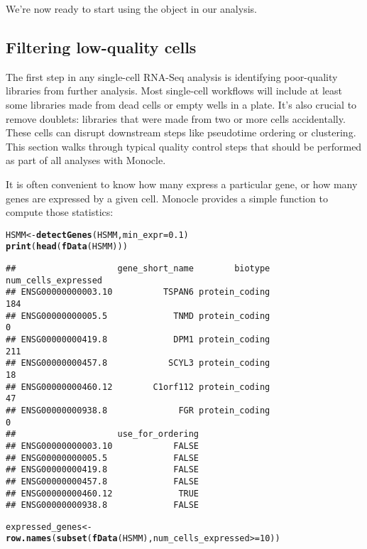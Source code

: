 \documentclass[10pt,oneside]{article}\usepackage[]{graphicx}\usepackage[]{color}
\makeatletter
\newcommand{\hlnum}[1]{\textcolor[rgb]{0.686,0.059,0.569}{#1}}%
\newcommand{\hlopt}[1]{\textcolor[rgb]{0,0,0}{#1}}%
\newcommand{\hlstd}[1]{\textcolor[rgb]{0.345,0.345,0.345}{#1}}%
\newcommand{\hlkwb}[1]{\textcolor[rgb]{0.69,0.353,0.396}{#1}}%
\newcommand{\hlkwc}[1]{\textcolor[rgb]{0.333,0.667,0.333}{#1}}%
\newcommand{\hlkwd}[1]{\textcolor[rgb]{0.737,0.353,0.396}{\textbf{#1}}}%
\newenvironment{kframe}{%
 \def\at@end@of@kframe{}%
 \ifinner\ifhmode%
  \def\at@end@of@kframe{\end{minipage}}%
  \begin{minipage}{\columnwidth}%
 \fi\fi%
 \def\FrameCommand##1{\hskip\@totalleftmargin \hskip-\fboxsep
 \colorbox{shadecolor}{##1}\hskip-\fboxsep
     \hskip-\linewidth \hskip-\@totalleftmargin \hskip\columnwidth}%
 \MakeFramed {\advance\hsize-\width
   \@totalleftmargin\z@ \linewidth\hsize
   \@setminipage}}%
 {\par\unskip\endMakeFramed%
 \at@end@of@kframe}
\newenvironment{knitrout}{}{} %
\makeatother
\begin{document}
 
 We're now ready to start using the  object in our analysis.
 
 \subsection{Filtering low-quality cells}
 The first step in any single-cell RNA-Seq analysis is identifying poor-quality libraries from further analysis. Most single-cell workflows will include at least some libraries made from dead cells or empty wells in a plate. It's also crucial to remove doublets: libraries that were made from two or more cells accidentally. These cells can disrupt downstream steps like pseudotime ordering or clustering. This section walks through typical quality control steps that should be performed as part of all analyses with Monocle.
 
 It is often convenient to know how many express a particular gene, or how many genes are expressed by a given cell. Monocle provides a simple function to compute those statistics: 
\begin{knitrout}
\color{fgcolor}\begin{kframe}
\begin{alltt}
\hlstd{HSMM} \hlkwb{<-} \hlkwd{detectGenes}\hlstd{(HSMM,} \hlkwc{min_expr} \hlstd{=} \hlnum{0.1}\hlstd{)}
\hlkwd{print}\hlstd{(}\hlkwd{head}\hlstd{(}\hlkwd{fData}\hlstd{(HSMM)))}
\end{alltt}
\begin{verbatim}
##                    gene_short_name        biotype num_cells_expressed
## ENSG00000000003.10          TSPAN6 protein_coding                 184
## ENSG00000000005.5             TNMD protein_coding                   0
## ENSG00000000419.8             DPM1 protein_coding                 211
## ENSG00000000457.8            SCYL3 protein_coding                  18
## ENSG00000000460.12        C1orf112 protein_coding                  47
## ENSG00000000938.8              FGR protein_coding                   0
##                    use_for_ordering
## ENSG00000000003.10            FALSE
## ENSG00000000005.5             FALSE
## ENSG00000000419.8             FALSE
## ENSG00000000457.8             FALSE
## ENSG00000000460.12             TRUE
## ENSG00000000938.8             FALSE
\end{verbatim}
\begin{alltt}
\hlstd{expressed_genes} \hlkwb{<-} \hlkwd{row.names}\hlstd{(}\hlkwd{subset}\hlstd{(}\hlkwd{fData}\hlstd{(HSMM), num_cells_expressed} \hlopt{>=} \hlnum{10}\hlstd{))}
\end{alltt}
\end{kframe}
\end{knitrout}
 
\end{document}
